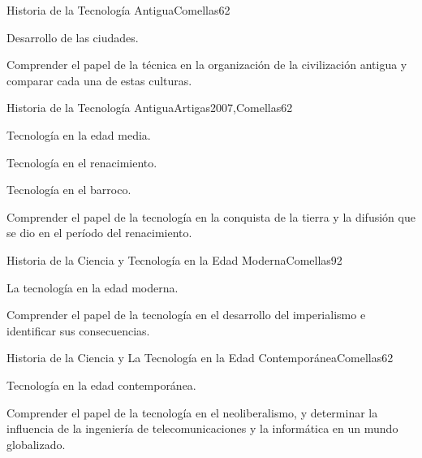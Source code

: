 \begin{syllabus}
\begin{unit}{Historia de la Tecnología Antigua}{Comellas}{6}{2}
\begin{topics}
    \item Desarrollo de las ciudades.
\end{topics}
\begin{learningoutcomes}
    \item Comprender el papel de la técnica en la organización de la civilización antigua y comparar cada una de estas culturas.
\end{learningoutcomes}
\end{unit}

\begin{unit}{Historia de la Tecnología Antigua}{Artigas2007,Comellas}{6}{2}
\begin{topics}
    \item Tecnología en la edad media.
    \item Tecnología en el renacimiento.
    \item Tecnología en el barroco.
\end{topics}
\begin{learningoutcomes}
    \item Comprender el  papel de la tecnología en la conquista de la tierra y la difusión que se dio en el período del renacimiento.
\end{learningoutcomes}

\end{unit}

\begin{unit}{Historia de la Ciencia y Tecnología en la Edad Moderna}{Comellas}{9}{2}
\begin{topics}
      \item {La tecnología en la edad moderna.}
\end{topics}
\begin{learningoutcomes}
	\item Comprender el  papel de la tecnología en el desarrollo del imperialismo e identificar sus consecuencias.
\end{learningoutcomes}
\end{unit}

\begin{unit}{Historia de la Ciencia y La Tecnología en la Edad Contemporánea}{Comellas}{6}{2}
\begin{topics}
      \item {Tecnología en la edad contemporánea.}
\end{topics}
\begin{learningoutcomes}
	\item Comprender el  papel de la tecnología en el neoliberalismo, y determinar la influencia de la ingeniería de telecomunicaciones y la informática en un mundo globalizado.
\end{learningoutcomes}
\end{unit}


\end{syllabus}
